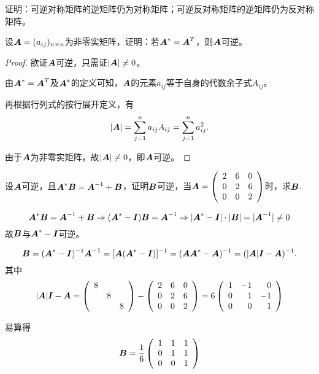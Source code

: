 \begin{li}
  证明：可逆对称矩阵的逆矩阵仍为对称矩阵；可逆反对称矩阵的逆矩阵仍为反对称矩阵。
\end{li}

\begin{li}
  设$\boldsymbol{A}=(a_{ij})_{n\times n}$为非零实矩阵，证明：若$\boldsymbol{A}^*=\boldsymbol{A}^T$，则$\boldsymbol{A}$可逆。
\end{li}
\begin{proof}
欲证$\boldsymbol{A}$可逆，只需证$|\boldsymbol{A}|\ne 0$。

由$\boldsymbol{A}^* = \boldsymbol{A}^T$及$\boldsymbol{A}^*$的定义可知，$\boldsymbol{A}$的元素$a_{ij}$等于自身的代数余子式$A_{ij}$。

再根据行列式的按行展开定义，有
$$
|\boldsymbol{A}| = \sum_{j=1}^n a_{ij} A_{ij} = \sum_{j=1}^n a_{ij}^2.
$$

由于$\boldsymbol{A}$为非零实矩阵，故$|\boldsymbol{A}|\ne 0$，即$\boldsymbol{A}$可逆。
\end{proof}

\begin{li}
  设$\boldsymbol{A}$可逆，且$\boldsymbol{A}^*\boldsymbol{B} = \boldsymbol{A}^{-1}+\boldsymbol{B}$，证明$\boldsymbol{B}$可逆，当$\boldsymbol{A}=\left(
    \begin{array}{ccc}
      2 & 6 & 0 \\
      0 & 2 & 6\\
      0 & 0 & 2
    \end{array}
  \right)$时，求$\boldsymbol{B}$.
\end{li}
\begin{jie}
$$
\boldsymbol{A}^*\boldsymbol{B} = \boldsymbol{A}^{-1}+\boldsymbol{B}  \Rightarrow (\boldsymbol{A}^*-\boldsymbol{I})\boldsymbol{B} = \boldsymbol{A}^{-1}
\Rightarrow |\boldsymbol{A}^*-\boldsymbol{I}|\cdot |\boldsymbol{B}| = |\boldsymbol{A}^{-1}|\ne 0 
$$
故$\boldsymbol{B}$与$\boldsymbol{A}^*-\boldsymbol{I}$可逆。

$$
\boldsymbol{B} = (\boldsymbol{A}^*-\boldsymbol{I})^{-1} \boldsymbol{A}^{-1} = [\boldsymbol{A}(\boldsymbol{A}^*-\boldsymbol{I})]^{-1} = (\boldsymbol{A}\boldsymbol{A}^*-\boldsymbol{A})^{-1} = (|\boldsymbol{A}|\boldsymbol{I}-\boldsymbol{A})^{-1}.
$$
其中
$$
|\boldsymbol{A}|\boldsymbol{I}-\boldsymbol{A} = \left(
  \begin{array}{ccc}
    8 & &\\
      & 8 &\\
      & & 8
  \end{array}
\right) - \left(
  \begin{array}{ccc}
    2 & 6 & 0 \\
    0 & 2 & 6\\
    0 & 0 & 2
  \end{array}
\right) = 6 \left(
  \begin{array}{rrr}
    1 & -1 & 0 \\
    0 &  1 & -1\\
    0 & 0 & 1
  \end{array}
\right)
$$

易算得
$$
\boldsymbol{B} = \frac16 \left(
  \begin{array}{rrr}
    1 &  1 & 1 \\
    0 &  1 & 1\\
    0 & 0 & 1
  \end{array}
\right)
$$
\end{jie}

